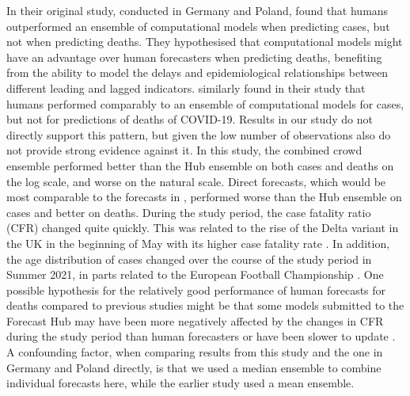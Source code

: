 \documentclass[10pt,a4paper,twocolumn]{article}
\begin{document}
In their original study, conducted in Germany and Poland, \citet{bosseComparingHumanModelbased2022} found that humans outperformed an ensemble of computational models when predicting cases, but not when predicting deaths. They hypothesised that computational models might have an advantage over human forecasters when predicting deaths, benefiting from the ability to model the delays and epidemiological relationships between different leading and lagged indicators. \citet{mcandrewChimericForecastingCombining2022} similarly found in their study that humans performed comparably to an ensemble of computational models for cases, but not for predictions of deaths of COVID-19. 
Results in our study do not directly support this pattern, but given the low number of observations also do not provide strong evidence against it. In this study, the combined crowd ensemble performed better than the Hub ensemble on both cases and deaths on the log scale, and worse on the natural scale. Direct forecasts, which would be most comparable to the forecasts in \citep{bosseComparingHumanModelbased2022}, performed worse than the Hub ensemble on cases and better on deaths. 
During the study period, the case fatality ratio (CFR) changed quite quickly. This was related to the rise of the Delta variant in the UK in the beginning of May with its higher case fatality rate \citep{bastIncreasedRiskHospitalisation2021}. In addition, the age distribution of cases changed over the course of the study period in Summer 2021, in parts related to the European Football Championship \citep{dehningImpactEuro20202023}.
One possible hypothesis for the relatively good performance of human forecasts for deaths compared to previous studies might be that some models submitted to the Forecast Hub may have been more negatively affected by the changes in CFR during the study period than human forecasters or have been slower to update . A confounding factor, when comparing results from this study and the one in Germany and Poland directly, is that we used a median ensemble to combine individual forecasts here, while the earlier study used a mean ensemble. 

\end{document}
